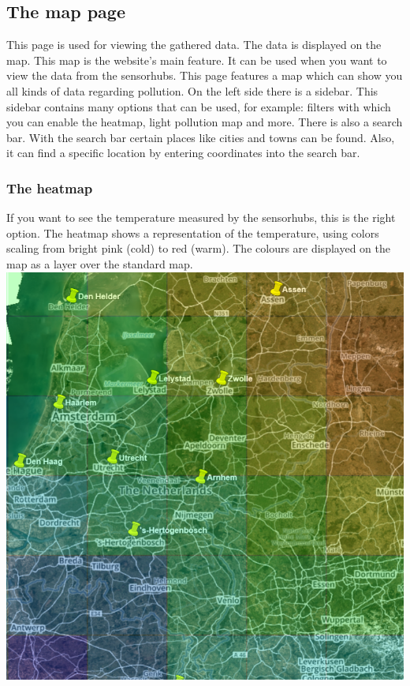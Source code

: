 \documentclass[a4paper]{article}
\begin{document}
\pagebreak

\subsection{The map page}
This page is used for viewing the gathered data. The data is displayed on the map. This map is the website's main feature. It can be used when you want to view the data from the sensorhubs.
\newline
This page features a map which can show you all kinds of data regarding pollution. On the left side there is a sidebar. This sidebar contains many options that can be used, for example: filters with which you can enable the heatmap, light pollution map and more.
\newline
There is also a search bar. With the search bar certain places like cities and towns can be found. Also, it can find a specific location by entering coordinates into the search bar.
~\newline

\subsubsection{The heatmap}
If you want to see the temperature measured by the sensorhubs, this is the right option.
The heatmap shows a representation of the temperature, using colors scaling from bright pink (cold) to red (warm). The colours are displayed on the map as a layer over the standard map.
~\newline\newline
\noindent
\includegraphics[width=\textwidth]{kaart}
% 
% 
\end{document}
